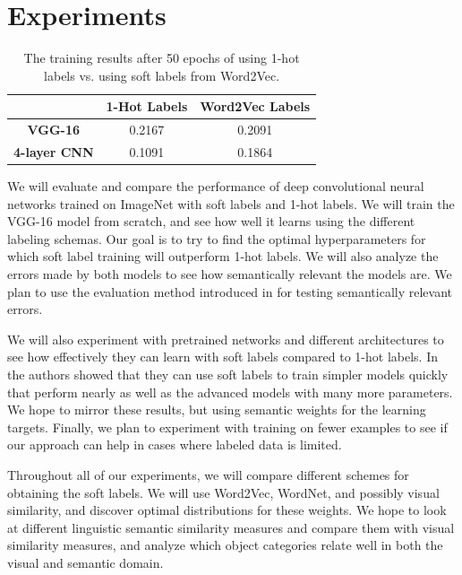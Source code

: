 \section{Experiments}

\begin{table}[!tb]
  \centering
  \begin{tabular}{|c|c|c|}
    \hline
      & \textbf{1-Hot Labels} & \textbf{Word2Vec Labels} \\
    \hline
      \textbf{VGG-16} & 0.2167 & 0.2091 \\
    \hline
      \textbf{4-layer CNN} & 0.1091 & 0.1864 \\
    \hline
  \end{tabular}
  \caption{
    The training results after 50 epochs of using 1-hot labels vs. using soft
    labels from Word2Vec.
  }
  \label{tbl:results}
\end{table}



We will evaluate and compare the performance of deep convolutional neural
networks trained on ImageNet with soft labels and 1-hot labels.
We will train the VGG-16 model \cite{simonyan2014very} from scratch, and see
how well it learns using the different labeling schemas. Our goal is to try to
find the optimal hyperparameters for which soft label training will outperform
1-hot labels.
We will also analyze the errors made by both models to see how semantically
relevant the models are.
We plan to use the evaluation method introduced in \cite{zhao2011large} for
testing semantically relevant errors.

We will also experiment with pretrained networks and different architectures to
see how effectively they can learn with soft labels compared to 1-hot labels.
In \cite{hinton2015distilling} the authors showed that they can use soft labels
to train simpler models quickly that perform nearly as well as the advanced
models with many more parameters. We hope to mirror these results, but using
semantic weights for the learning targets.
Finally, we plan to experiment with training on fewer examples to see if our
approach can help in cases where labeled data is limited.

Throughout all of our experiments, we will compare different schemes for
obtaining the soft labels. We will use Word2Vec, WordNet, and possibly visual
similarity, and discover optimal distributions for these weights.
We hope to look at different linguistic semantic similarity measures and
compare them with visual similarity measures, and analyze which object
categories relate well in both the visual and semantic domain.




